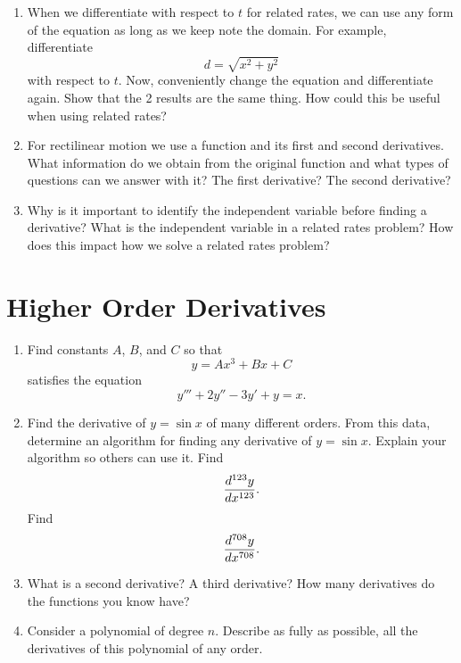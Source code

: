 \begin{enumerate}
\item  When we differentiate with respect to $t$ for related rates, we can use any form of the equation as long as we keep note the domain.  For example, differentiate $$d = \sqrt {x^2  + y^2 } $$ with respect to $t$.  Now, conveniently change the equation and differentiate again.  Show that the 2 results are the same thing.  How could this be useful when using related rates?

\item  For rectilinear motion we use a function and its first and second derivatives.  What information do we obtain from the original function and what types of questions can we answer with it?  The first derivative?  The second derivative?

\item  Why is it important to identify the independent variable before finding a derivative?  What is the independent variable in a related rates problem?  How does this impact how we solve a related rates problem?  
\end{enumerate}\section{Higher Order Derivatives}\begin{enumerate}

\item  Find constants $A$, $B$, and $C$ so that $$y = Ax^3  + Bx + C$$ satisfies the equation $$y''' + 2y'' - 3y' + y = x.$$  

\item  Find the derivative of $y = \sin x$ of many different orders.  From this data, determine an algorithm for finding any derivative of $y = \sin x$.  Explain your algorithm so others can use it.  Find $${{d^{123} y} \over {dx^{123} }}.$$  Find $${{d^{708} y} \over {dx^{708} }}.$$

\item  What is a second derivative?  A third derivative?  How many derivatives do the functions you know have?   \cite{FWG}

\item  Consider a polynomial of degree $n$.  Describe as fully as possible, all the derivatives of this polynomial of any order.
\end{enumerate}
